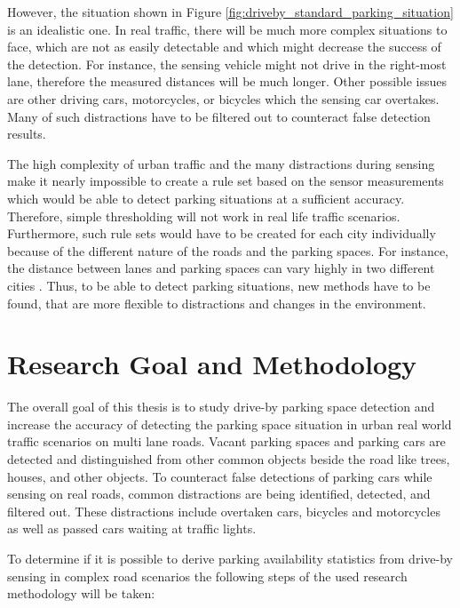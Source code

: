 However, the situation shown in Figure \ref{fig:driveby_standard_parking_situation} is an idealistic one. In real traffic, there will be much more complex situations to face, which are not as easily detectable and which might decrease the success of the detection. For instance, the sensing vehicle might not drive in the right-most lane, therefore the measured distances will be much longer. Other possible issues are other driving cars, motorcycles, or bicycles which the sensing car overtakes. Many of such distractions have to be filtered out to counteract false detection results.

The high complexity of urban traffic and the many distractions during sensing make it nearly impossible to create a rule set based on the sensor measurements which would be able to detect parking situations at a sufficient accuracy. Therefore, simple thresholding will not work in real life traffic scenarios. Furthermore, such rule sets would have to be created for each city individually because of the different nature of the roads and the parking spaces. For instance, the distance between lanes and parking spaces can vary highly in two different cities \cite{Grassi:2017:PIE:3132211.3134452}. Thus, to be able to detect parking situations, new methods have to be found, that are more flexible to distractions and changes in the environment.




\section{Research Goal and Methodology}

The overall goal of this thesis is to study drive-by parking space detection and increase the accuracy of detecting the parking space situation in urban real world traffic scenarios on multi lane roads. Vacant parking spaces and parking cars are detected and distinguished from other common objects beside the road like trees, houses, and other objects. To counteract false detections of parking cars while sensing on real roads, common distractions are being identified, detected, and filtered out. These distractions include overtaken cars, bicycles and motorcycles as well as passed cars waiting at traffic lights.

To determine if it is possible to derive parking availability statistics from drive-by sensing in complex road scenarios the following steps of the used research methodology will be taken:



